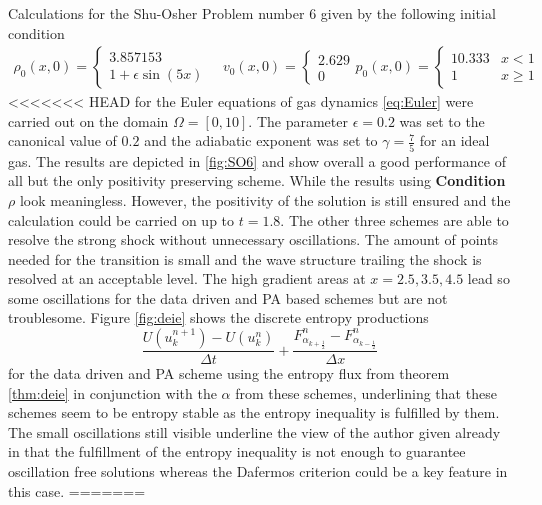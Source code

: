 Calculations for the Shu-Osher Problem number 6 \cite{SO1988, SO1989} given by the following initial condition 
	\begin{align*}
		\rho_0(x, 0) = \begin{cases}3.857153  \\ 1 + \epsilon \sin(5 x)  \end{cases} 
		\quad 
		v_0(x, 0) = \begin{cases} 2.629  \\ 0  \end{cases}
		p_0(x, 0) = \begin{cases} 10.333 & x < 1 \\ 1 & x \geq 1 \end{cases}
	\end{align*}
<<<<<<< HEAD
	for the Euler equations of gas dynamics \ref{eq:Euler} were carried out on the domain $\Omega = [0, 10]$. The parameter $\epsilon = 0.2$ was set to the canonical value of $0.2$ and the adiabatic exponent was set to $\gamma=\frac 7 5$ for an ideal gas. The results are depicted in \ref{fig:SO6} and show overall a good performance of all but the only positivity preserving scheme. While the results using \textbf{Condition $\rho$} look meaningless. However, the positivity of the solution is still ensured and the calculation could be carried on up to $t = 1.8$. The other three schemes are able to resolve the strong shock without unnecessary oscillations. The amount of points needed for the transition is small and the wave structure trailing the shock is resolved at an acceptable level. The high gradient areas at $x=2.5, 3.5, 4.5$ lead so some oscillations for the data driven and PA based schemes but are not troublesome. Figure \ref{fig:deie} shows the discrete entropy productions 
	\[
		\frac{U(u^{n+1}_k) - U(u^n_k)}{\Delta t} + \frac{F^n_{\alpha_{k + \frac 1 2}} - F^n_{\alpha_{k - \frac 1 2}}}{\Delta x}
	\]
	for the data driven and PA scheme using the entropy flux from theorem  \ref{thm:deie} in conjunction with the $\alpha$ from these schemes, underlining that these schemes seem to be entropy stable as the entropy inequality is fulfilled by them. The small oscillations still visible underline the view of the author given already in \cite{klein2021using} that the fulfillment of the entropy inequality is not enough to guarantee oscillation free solutions whereas the Dafermos criterion could be a key feature in this case. 
=======
